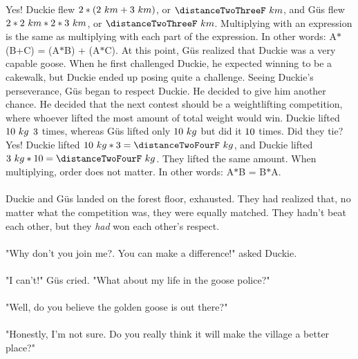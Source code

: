 {Yes! Duckie flew $2\ast(2~km + 3~km)$, or $\distanceTwoThreeF~km$, and G{\"u}s flew $2\ast2~km\ast2\ast3~km$, or $\distanceTwoThreeF~km$.}
{Multiplying with an expression is the same as multiplying with each part of the expression. In other words: A$\ast$(B+C) = (A$\ast$B) + (A$\ast$C).}
{}
{At this point, G{\"u}s realized that Duckie was a very capable goose. When he first challenged Duckie, he expected winning to be a cakewalk, but Duckie ended up posing quite a challenge. Seeing Duckie's perseverance, G{\"u}s began to respect Duckie. He decided to give him another chance. He decided that the next contest should be a weightlifting competition, where whoever lifted the most amount of total weight would win. Duckie lifted $10~kg$  $3$ times, whereas G{\"u}s lifted only $10~kg$ but did it $10$ times. Did they tie?}
{Yes! Duckie lifted $\distanceTwoFourTw~kg\ast\distanceTwoFourO=\distanceTwoFourF~kg$, and Duckie lifted $\distanceTwoFourO~kg \ast\distanceTwoFourTw=\distanceTwoFourF~kg$. They lifted the same amount.}
{When multiplying, order does not matter. In other words: A$\ast$B = B$\ast$A.}
{}
\paragraph{} Duckie and G{\"u}s landed on the forest floor, exhausted. They had realized that, no matter what the competition was, they were equally matched. They hadn't beat each other, but they \textit{had} won each other's respect. 
\paragraph{} "Why don't you join me?. You can make a difference!" asked Duckie.
\paragraph{} "I can't!" G{\"u}s cried. "What about my life in the goose police?"
\paragraph{} "Well, do you believe the golden goose is out there?"
\paragraph{} "Honestly, I'm not sure. Do you really think it will make the village a better place?"
